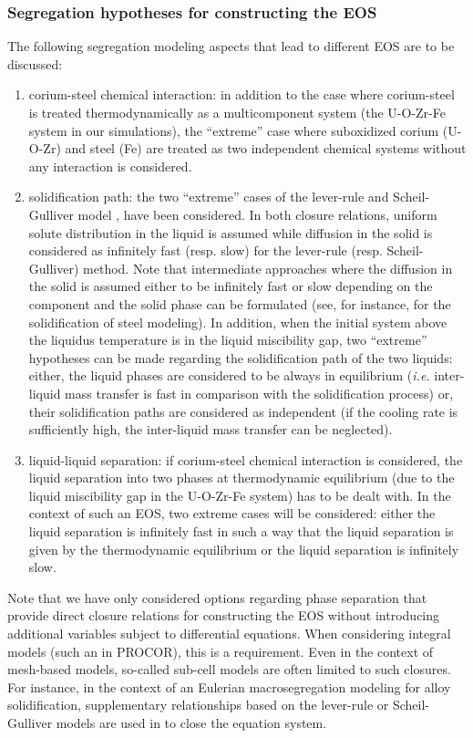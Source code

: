 \subsubsection{Segregation hypotheses for constructing the EOS} 

The following segregation modeling aspects that lead to different EOS are to be discussed:
\begin{enumerate}
 \item corium-steel chemical interaction: in addition to the case where corium-steel is treated thermodynamically as a multicomponent system (the U-O-Zr-Fe system in our simulations), the ``extreme'' case where suboxidized corium (U-O-Zr) and steel (Fe) are treated as two independent chemical systems without any interaction is considered.
 
 \item solidification path: the two ``extreme'' cases of the lever-rule and Scheil-Gulliver model \cite{Scheil1942}, have been considered. In both closure relations, uniform solute distribution in the liquid is assumed while diffusion in the solid is considered as infinitely fast (resp. slow) for the lever-rule (resp. Scheil-Gulliver) method. Note that intermediate approaches where the diffusion in the solid is assumed either to be infinitely fast or slow depending on the component and the solid phase can be formulated (see, for instance, \cite{Chen2002,Schaffnit2015,Kozeschnik2007} for the solidification of steel modeling). In addition, when the initial system above the liquidus temperature is in the liquid miscibility gap, two ``extreme'' hypotheses can be made regarding the solidification path of the two liquids: either, the liquid phases are considered to be always in equilibrium (\textit{i.e.} inter-liquid mass transfer is fast in comparison with the solidification process) or, their solidification 
paths are considered as independent (if the cooling rate is sufficiently high, the inter-liquid mass transfer can be neglected).
 
 \item liquid-liquid separation: if corium-steel chemical interaction is considered, the liquid separation into two phases at thermodynamic equilibrium (due to the liquid miscibility gap in the U-O-Zr-Fe system) has to be dealt with. In the context of such an EOS, two extreme cases will be considered: either the liquid separation is infinitely fast in such a way that the liquid separation is given by the thermodynamic equilibrium or the liquid separation is infinitely slow.
\end{enumerate}
Note that we have only considered options regarding phase separation that provide direct closure relations for constructing the EOS without introducing additional variables subject to differential equations. When considering integral models (such an in PROCOR), this is a requirement. Even in the context of mesh-based models, so-called sub-cell models are often limited to such closures. For instance, in the context of an Eulerian macrosegregation modeling for alloy solidification, supplementary relationships based on the lever-rule or Scheil-Gulliver models are used in \cite{Du2007} to close the equation system.
 
